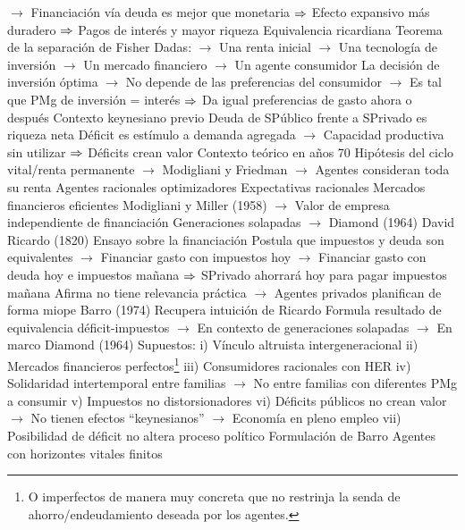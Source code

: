 \documentclass{nuevotema}
\begin{document}
\begin{esquemal}
				\4[] $\to$ Financiación vía deuda es mejor que monetaria
				\4[] $\Rightarrow$ Efecto expansivo más duradero
				\4[] $\Rightarrow$ Pagos de interés y mayor riqueza
			\3 Equivalencia ricardiana
				\4 Teorema de la separación de Fisher
				\4[] Dadas:
				\4[] $\to$ Una renta inicial
				\4[] $\to$ Una tecnología de inversión
				\4[] $\to$ Un mercado financiero
				\4[] $\to$ Un agente consumidor
				\4[] La decisión de inversión óptima
				\4[] $\to$ No depende de las preferencias del consumidor
				\4[] $\to$ Es tal que PMg de inversión = interés
				\4[] $\Rightarrow$ Da igual preferencias de gasto ahora o después
				\4 Contexto keynesiano previo
				\4[] Deuda de SPúblico frente a SPrivado es riqueza neta
				\4[] Déficit es estímulo a demanda agregada
				\4[] $\to$ Capacidad productiva sin utilizar
				\4[] $\Rightarrow$ Déficits crean valor
				\4 Contexto teórico en años 70
				\4[] Hipótesis del ciclo vital/renta permanente
				\4[] $\to$ Modigliani y Friedman
				\4[] $\to$ Agentes consideran toda su renta
				\4[] Agentes racionales optimizadores
				\4[] Expectativas racionales
				\4[] Mercados financieros eficientes
				\4[] Modigliani y Miller (1958)
				\4[] $\to$ Valor de empresa independiente de financiación
				\4[] Generaciones solapadas
				\4[] $\to$ Diamond (1964)
				\4 David Ricardo (1820)
				\4[] Ensayo sobre la financiación
				\4[] Postula que impuestos y deuda son equivalentes
				\4[] $\to$ Financiar gasto con impuestos hoy
				\4[] $\to$ Financiar gasto con deuda hoy e impuestos mañana
				\4[] $\Rightarrow$ SPrivado ahorrará hoy para pagar impuestos mañana
				\4[] Afirma no tiene relevancia práctica
				\4[] $\to$ Agentes privados planifican de forma miope
				\4 Barro (1974)
				\4[] Recupera intuición de Ricardo
				\4[] Formula resultado de equivalencia déficit-impuestos
				\4[] $\to$ En contexto de generaciones solapadas
				\4[] $\to$ En marco Diamond (1964)
				\4[] Supuestos:
				\4[] i) Vínculo altruista intergeneracional
				\4[] ii) Mercados financieros perfectos\footnote{O imperfectos de manera muy concreta que no restrinja la senda de ahorro/endeudamiento deseada por los agentes.}
				\4[] iii) Consumidores racionales con HER
				\4[] iv) Solidaridad intertemporal entre familias
				\4[] $\to$ No entre familias con diferentes PMg a consumir
				\4[] v) Impuestos no distorsionadores
				\4[] vi) Déficits públicos no crean valor
				\4[] $\to$ No tienen efectos ``keynesianos''
				\4[] $\to$ Economía en pleno empleo
				\4[] vii) Posibilidad de déficit no altera proceso político
				\4 Formulación de Barro
				\4[] Agentes con horizontes vitales finitos

\end{esquemal}
\end{document}
